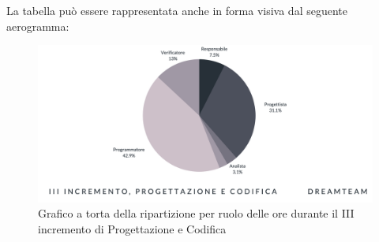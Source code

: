La tabella può essere rappresentata anche in forma visiva dal seguente aerogramma:
\begin{figure}[H]
\centering
\includegraphics[scale=0.55]{Sezioni/SezioniPreventivo/grafici/Preventivo_torta_progettazione_III.png}
\caption{Grafico a torta della ripartizione per ruolo delle ore durante il III incremento di Progettazione e Codifica}
\end{figure}

\pagebreak


